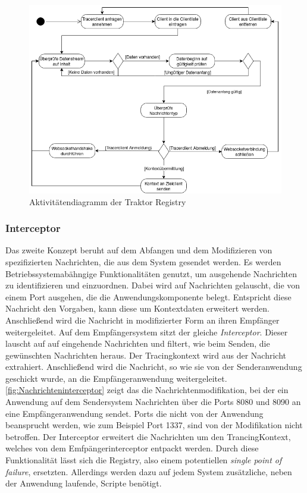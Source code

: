 \begin{figure}[!ht]
	\centering
	\includegraphics[scale=0.65]{img/Design/Traktor-Registry.png}
	\caption[Aktivitätendiagramm der Traktor Registry]{Aktivitätendiagramm der Traktor Registry}
	\label{fig:Traktor-Registry}
\end{figure}

\subsubsection{Interceptor}
Das zweite Konzept beruht auf dem Abfangen und dem Modifizieren von spezifizierten Nachrichten, die aus dem System gesendet werden. Es werden Betriebssystemabähngige Funktionalitäten genutzt, um ausgehende Nachrichten zu identifizieren und einzuordnen. Dabei wird auf Nachrichten gelauscht, die von einem Port ausgehen, die die Anwendungskomponente belegt. Entspricht diese Nachricht den Vorgaben, kann diese um Kontextdaten erweitert werden. Anschließend wird die Nachricht in modifizierter Form an ihren Empfänger weitergeleitet. Auf dem Empfängersystem sitzt der gleiche \emph{Interceptor}. Dieser lauscht auf auf eingehende Nachrichten und filtert, wie beim Senden, die gewünschten Nachrichten heraus. Der Tracingkontext wird aus der Nachricht extrahiert. Anschließend wird die Nachricht, so wie sie von der Senderanwendung geschickt wurde, an die Empfängeranwendung weitergeleitet. \cref{fig:Nachrichteninterceptor} zeigt das die Nachrichtenmodifikation, bei der ein Anwendung auf dem Sendersystem Nachrichten über die Ports 8080 und 8090 an eine Empfängeranwendung sendet. Ports die nicht von der Anwendung beansprucht werden, wie zum Beispiel Port 1337, sind von der Modifikation nicht betroffen. Der Interceptor erweitert die Nachrichten um den TrancingKontext, welches von dem Emfpängerinterceptor entpackt werden. Durch diese Funktionalität lässt sich die Registry, also einem potentiellen \emph{single point of failure}, ersetzten. Allerdings werden dazu auf jedem System zusätzliche, neben der Anwendung laufende, Scripte benötigt.

